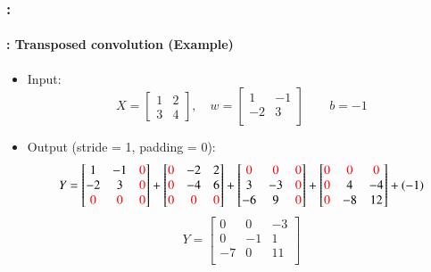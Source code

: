 \documentclass[xcolor=table]{beamer}
\begin{document}
\begin{frame}
	\frametitle{\insertshortsubtitle: \insertsection}
	\framesubtitle{\insertsubsection: Transposed convolution (Example)}
	
	
	\begin{itemize}

		\item Input:
		\scriptsize
		\[
		X =
		\begin{bmatrix}
			1 & 2 \\
			3 & 4
		\end{bmatrix}
		,
		\quad
		w = 
		\begin{bmatrix}
			1 & -1 \\
			-2 & 3\\
		\end{bmatrix}
		\quad\quad
		b = -1
		\]
		
		\item Output (stride = 1, padding = 0):
		\scriptsize
		\[
		Y =
		\begin{bmatrix}
			1 & -1 & \color{red}0 \\
			-2 & 3 & \color{red}0 \\
			\color{red}0 & \color{red}0 & \color{red}0 \\
		\end{bmatrix}
		+
		\begin{bmatrix}
			\color{red}0 & -2 & 2 \\
			\color{red}0 & -4 & 6 \\
			\color{red}0 & \color{red}0 & \color{red}0 \\
		\end{bmatrix}
		+
		\begin{bmatrix}
			\color{red}0 & \color{red}0 & \color{red}0 \\
			3 & -3 & \color{red}0 \\
			-6 & 9 & \color{red}0 \\
		\end{bmatrix}
		+
		\begin{bmatrix}
			\color{red}0 & \color{red}0 & \color{red}0 \\
			\color{red}0 & 4 & -4 \\
			\color{red}0 & -8 & 12 \\
		\end{bmatrix}
		+ (-1)
		\]
		\[
		Y =
		\begin{bmatrix}
			0 & 0 & -3 \\
			0 & -1 & 1 \\
			-7 & 0 & 11 \\
		\end{bmatrix}
		\]
	\end{itemize}
	
\end{frame}
\end{document}

